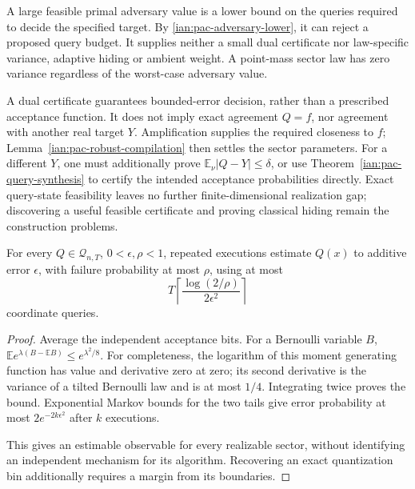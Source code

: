 \begin{remark}
\label{ian:pac-realization-gap}
A large feasible primal adversary value is a lower bound on the
queries required to decide the specified target. By
\eqref{ian:pac-adversary-lower}, it can reject a proposed query
budget. It supplies neither a small dual certificate nor
law-specific variance, adaptive hiding or ambient weight.
A point-mass sector law has zero variance regardless of the
worst-case adversary value.

A dual certificate guarantees bounded-error decision, rather than
a prescribed acceptance function. It does not imply exact
agreement \(Q=f\), nor agreement with another real target
\(Y\). Amplification supplies the required closeness to \(f\);
Lemma~\ref{ian:pac-robust-compilation} then settles the sector
parameters. For a different \(Y\), one must additionally prove
\(\mathbb E_\nu|Q-Y|\le\delta\), or use
Theorem~\ref{ian:pac-query-synthesis} to certify the intended
acceptance probabilities directly. Exact query-state feasibility
leaves no further finite-dimensional realization gap; discovering
a useful feasible certificate and proving classical hiding remain
the construction problems.
\end{remark}

\begin{proposition}
\label{ian:pac-observable-converse}
For every \(Q\in\mathcal Q_{n,T}\), \(0<\epsilon,\rho<1\), repeated
executions estimate \(Q(x)\) to additive error \(\epsilon\), with
failure probability at most \(\rho\), using at most
\[
 T\left\lceil
       \frac{\log(2/\rho)}{2\epsilon^2}
   \right\rceil
\]
coordinate queries.
\end{proposition}

\begin{proof}
Average the independent acceptance bits.
For a Bernoulli variable \(B\),
\(\mathbb E e^{\lambda(B-\mathbb EB)}
 \le e^{\lambda^2/8}\).
For completeness, the logarithm of this moment generating
function has value and derivative zero at zero; its second
derivative is the variance of a tilted Bernoulli law and is at
most \(1/4\). Integrating twice proves the bound.
Exponential Markov bounds for the two tails give error probability
at most \(2e^{-2k\epsilon^2}\) after \(k\) executions.

This gives an estimable observable for every realizable sector,
without identifying an independent mechanism for its algorithm.
Recovering an exact quantization bin additionally requires a
margin from its boundaries.
\end{proof}


